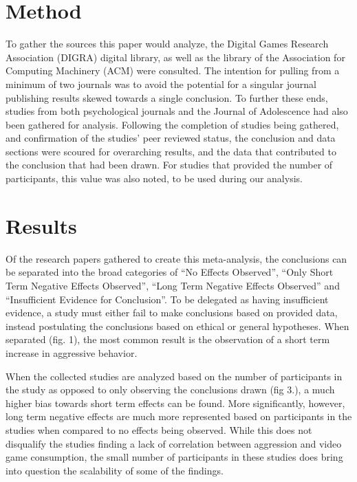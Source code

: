 \documentclass[11pt]{article}
\begin{document}
\section{Method} 
To gather the sources this paper would analyze, the Digital Games Research Association (DIGRA) digital library, as well as the library of the Association for Computing Machinery (ACM) were consulted. The intention for pulling from a minimum of two journals was to avoid the potential for a singular journal publishing results skewed towards a single conclusion. To further these ends, studies from both psychological journals and the Journal of Adolescence had also been gathered for analysis. Following the completion of studies being gathered, and confirmation of the studies’ peer reviewed status, the conclusion and data sections were scoured for overarching results, and the data that contributed to the conclusion that had been drawn. For studies that provided the number of participants, this value was also noted, to be used during our analysis.

\section{Results}
Of the research papers gathered to create this meta-analysis, the conclusions can be separated into the broad categories of “No Effects Observed”, “Only Short Term Negative Effects Observed”, “Long Term Negative Effects Observed” and “Insufficient Evidence for Conclusion”. To be delegated as having insufficient evidence, a study must either fail to make conclusions based on provided data, instead postulating the conclusions based on ethical or general hypotheses. When separated (fig. 1), the most common result is the observation of a short term increase in aggressive behavior.

When the collected studies are analyzed based on the number of participants in the study as opposed to only observing the conclusions drawn (fig 3.), a much higher bias towards short term effects can be found. More significantly, however, long term negative effects are much more represented based on participants in the studies when compared to no effects being observed. While this does not disqualify the studies finding a lack of correlation between aggression and video game consumption, the small number of participants in these studies does bring into question the scalability of some of the findings.
\end{document}
